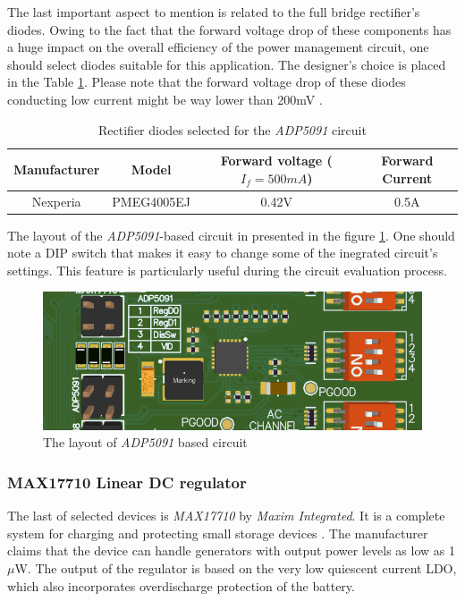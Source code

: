 \documentclass[12pt,a4paper]{article}
\begin{document}
The last important aspect to mention is related to the full bridge rectifier's diodes. Owing to the fact that the forward voltage drop of these components has a huge impact on the overall efficiency of the power management circuit, one should select diodes suitable for this application. The designer's choice is placed in the Table \ref{tab:adp5091_diodes}. Please note that the forward voltage drop of these diodes conducting low current might be way lower than 200mV \cite{diodes_params}.
\begin{table}[ht!]
\begin{tabular}{|c|c|c|c|}
\hline
\textbf{Manufacturer} & \textbf{Model} & \textbf{Forward voltage ($I_f=500mA$)} & \textbf{Forward Current}\\ \hline
 Nexperia & PMEG4005EJ & 0.42V & 0.5A      \\ \hline

\end{tabular}
\caption{Rectifier diodes selected for the \textit{ADP5091} circuit \cite{diodes_params}}
\label{tab:adp5091_diodes}
\end{table}
\par

The layout of the \textit{ADP5091}-based circuit in presented in the figure \ref{fig:adp5091layout}. One should note a DIP switch that makes it easy to change some of the inegrated circuit's settings. This feature is particularly useful during the circuit evaluation process.
\begin{figure}[ht!]
\includegraphics[scale=0.8]{adp5091_layout.png}
\caption{The layout of \textit{ADP5091} based circuit}
\label{fig:adp5091layout}
\end{figure}
\par
\subsubsection{MAX17710 Linear DC regulator}
The last of selected devices is \textit{MAX17710} by \textit{Maxim Integrated}. It is a complete system for charging and protecting small storage devices \cite{max17710_params}. The manufacturer claims that the device can handle generators with output power levels as low as 1$\mu$W. The output of the regulator is based on the very low quiescent current LDO, which also incorporates overdischarge protection of the battery.
\par
\end{document}
